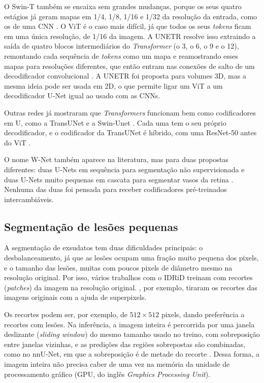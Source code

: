 O Swin-T também se encaixa sem grandes mudanças, porque os seus quatro estágios já geram mapas em 1/4, 1/8, 1/16 e 1/32 da resolução da entrada, como os de uma CNN \cite{liu2021swin}. O ViT é o caso mais difícil, já que todos os seus \textit{tokens} ficam em uma única resolução, de 1/16 da imagem. A UNETR resolve isso extraindo a saída de quatro blocos intermediários do \textit{Transformer} (o 3, o 6, o 9 e o 12), remontando cada sequência de \textit{tokens} como um mapa e reamostrando esses mapas para resoluções diferentes, que então entram nas conexões de salto de um decodificador convolucional \cite{hatamizadeh2022unetr}. A UNETR foi proposta para volumes 3D, mas a mesma ideia pode ser usada em 2D, o que permite ligar um ViT a um decodificador U-Net igual ao usado com as CNNs.

Outras redes já mostraram que \textit{Transformers} funcionam bem como codificadores em U, como a TransUNet \cite{chen2021transunet} e a Swin-Unet \cite{cao2023swinunet}. Cada uma tem o seu próprio decodificador, e o codificador da TransUNet é híbrido, com uma ResNet-50 antes do ViT \cite{chen2021transunet}.

O nome W-Net também aparece na literatura, mas para duas propostas diferentes: duas U-Nets em sequência para segmentação não supervisionada \cite{xia2017wnet} e duas U-Nets muito pequenas em cascata para segmentar vasos da retina \cite{galdran2022wnet}. Nenhuma das duas foi pensada para receber codificadores pré-treinados intercambiáveis.

\subsection{Segmentação de lesões pequenas}
\label{sec:seg-lesoes}

A segmentação de exsudatos tem duas dificuldades principais: o desbalanceamento, já que as lesões ocupam uma fração muito pequena dos pixels, e o tamanho das lesões, muitas com poucos pixels de diâmetro mesmo na resolução original. Por isso, vários trabalhos com o IDRiD treinam com recortes (\textit{patches}) da imagem na resolução original. , por exemplo, tiraram os recortes das imagens originais com a ajuda de superpixels.

Os recortes podem ser, por exemplo, de $512 \times 512$ pixels, dando preferência a recortes com lesões. Na inferência, a imagem inteira é percorrida por uma janela deslizante (\textit{sliding window}) do mesmo tamanho usado no treino, com sobreposição entre janelas vizinhas, e as predições das regiões sobrepostas são combinadas, como no nnU-Net, em que a sobreposição é de metade do recorte \cite{isensee2021nnunet}. Dessa forma, a imagem inteira não precisa caber de uma vez na memória da unidade de processamento gráfico (GPU, do inglês \textit{Graphics Processing Unit}).

